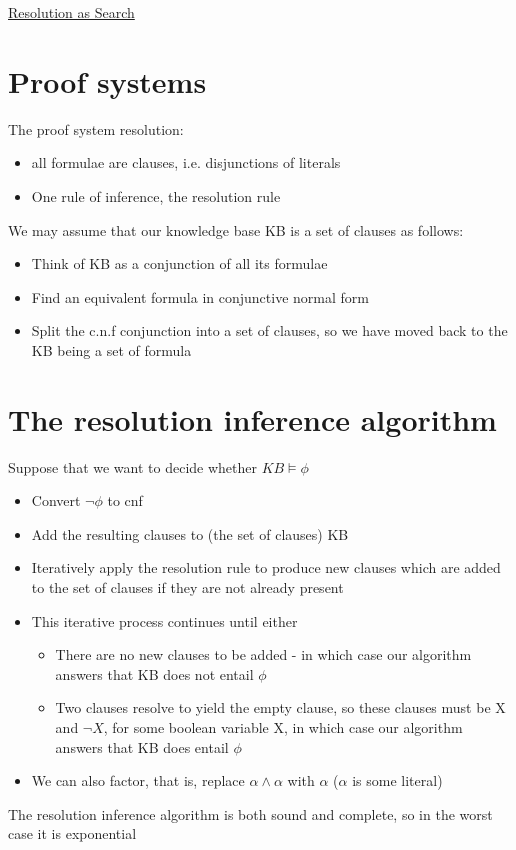 \documentclass{article}[18pt]
\begin{document}
\begin{center}
\underline{\huge Resolution as Search}
\end{center}
\section{Proof systems}
The proof system resolution:
\begin{itemize}
	\item all formulae are clauses, i.e. disjunctions of literals
	\item One rule of inference, the resolution rule
\end{itemize}
We may assume that our knowledge base KB is a set of clauses as follows:
\begin{itemize}
	\item Think of KB as a conjunction of all its formulae
	\item Find an equivalent formula in conjunctive normal form
	\item Split the c.n.f conjunction into a set of clauses, so we have moved back to the KB being a set of formula
\end{itemize}
\section{The resolution inference algorithm}
Suppose that we want to decide whether $KB \models \phi$
\begin{itemize}
	\item Convert $\lnot \phi$ to cnf
	\item Add the resulting clauses to (the set of clauses) KB
	\item Iteratively apply the resolution rule to produce new clauses which are added to the set of clauses if they are not already present
	\item This iterative process continues until either
	\begin{itemize}
		\item There are no new clauses to be added - in which case our algorithm answers that KB does not entail $\phi$
		\item Two clauses resolve to yield the empty clause, so these clauses must be X and $\lnot X$, for some boolean variable X, in which case our algorithm answers that KB does entail $\phi$
	\end{itemize}
	\item We can also factor, that is, replace $\alpha\land \alpha$ with $\alpha$ ($\alpha$ is some literal)
\end{itemize}
The resolution inference algorithm is both sound and complete, so in the worst case it is exponential
\end{document}
